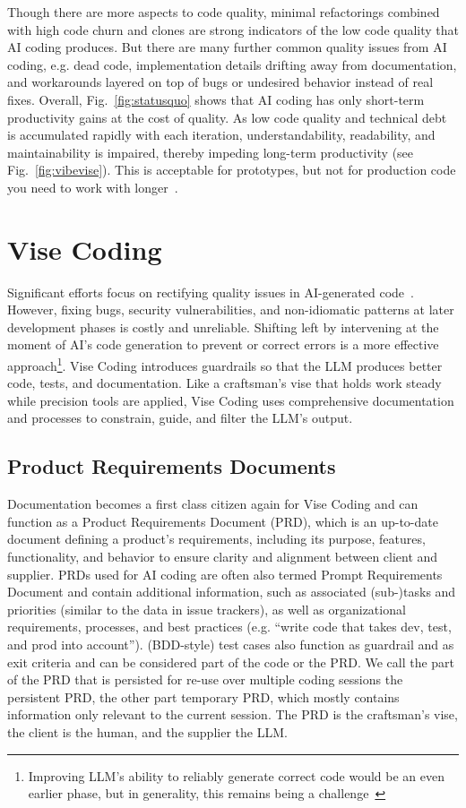 \documentclass[twocolumn,german]{article}
\begin{document}
Though there are more aspects to code quality, minimal refactorings combined with high code churn and clones 
are strong indicators of the low code quality that AI coding produces.
But there are many further common quality issues from AI coding, e.g. dead code,
implementation details drifting away from documentation,
and workarounds layered on top of bugs or undesired behavior instead of real fixes. 
Overall, Fig.~\ref{fig:statusquo} shows that AI coding has only short-term productivity gains at the cost of quality.
As low code quality and technical debt is accumulated rapidly with each iteration, understandability, readability, and maintainability is impaired, thereby impeding long-term productivity (see Fig.~\ref{fig:vibevise}). This is acceptable for prototypes, but not for production code you need to work with longer~\cite{AO25}.

\section{Vise Coding}

Significant efforts focus on rectifying quality issues in AI-generated code~\cite{URL:payasyoucode,URL:pragmaticcoders,URL:SECVAIB}.
However, fixing bugs, security vulnerabilities, and non-idiomatic patterns at later development phases is costly and unreliable.
Shifting left by intervening at the moment of AI's code generation to prevent or correct errors is a more effective approach\footnote{Improving LLM's ability to reliably generate correct code would be an even earlier phase, but in generality, this remains being a challenge~\cite{KH25,JB25,PL25,MH25,PS25,RS25}}.
Vise Coding introduces guardrails so that the LLM produces better code, tests, and documentation. 
Like a craftsman's vise that holds work steady while precision tools are applied,
Vise Coding uses comprehensive documentation and processes to constrain, guide, and filter the LLM's output.

\subsection{Product Requirements Documents}

Documentation becomes a first class citizen again for Vise Coding and
can function as a Product Requirements Document (PRD),
which is an up-to-date document defining a product's requirements,
including its purpose, features, functionality, and behavior to ensure clarity and alignment between client and supplier. 
PRDs used for AI coding are often also termed Prompt Requirements Document and
contain additional information, such as associated (sub-)tasks and priorities (similar to the data in issue trackers),
as well as organizational requirements, processes, and best practices (e.g. ``write code that takes dev, test, and prod into account'').
(BDD-style) test cases also function as guardrail and as exit criteria
and can be considered part of the code or the PRD.
We call the part of the PRD that is persisted for re-use over multiple coding sessions the persistent PRD, 
the other part temporary PRD, which mostly contains information only relevant to the current session.
The PRD is the craftsman's vise, the client is the human, and the supplier the LLM.
\end{document}

